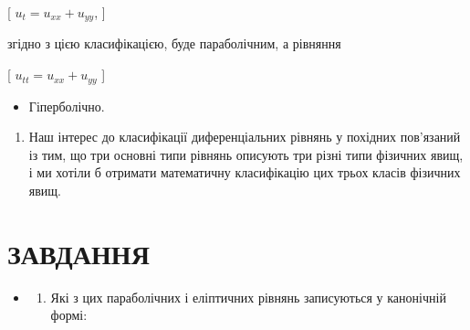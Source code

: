 \documentclass[
]{article}
\providecommand{\tightlist}{%
  \setlength{\itemsep}{0pt}\setlength{\parskip}{0pt}}
\begin{document}
{{{{[} \(u_t = u_{xx} + u_{yy}\), {]}

згідно з цією класифікацією, буде параболічним, а рівняння

{[} \(u_{tt} = u_{xx} + u_{yy}\) {]}

\begin{itemize}
\tightlist
\item
  Гіперболічно.
\end{itemize}

\begin{enumerate}
\def\labelenumi{\arabic{enumi}.}
\setcounter{enumi}{1}
\tightlist
\item
  Наш інтерес до класифікації диференціальних рівнянь у похідних
  пов'язаний із тим, що три основні типи рівнянь описують три різні типи
  фізичних явищ, і ми хотіли б отримати математичну класифікацію цих
  трьох класів фізичних явищ.
\end{enumerate}

\section{ЗАВДАННЯ}\label{ux437ux430ux432ux434ux430ux43dux43dux44f-9}

\begin{itemize}
\item
  \begin{enumerate}
  \def\labelenumi{\arabic{enumi}.}
  \tightlist
  \item
    Які з цих параболічних і еліптичних рівнянь записуються у канонічній
    формі:
  \end{enumerate}


\end{itemize}}}}
\end{document}
